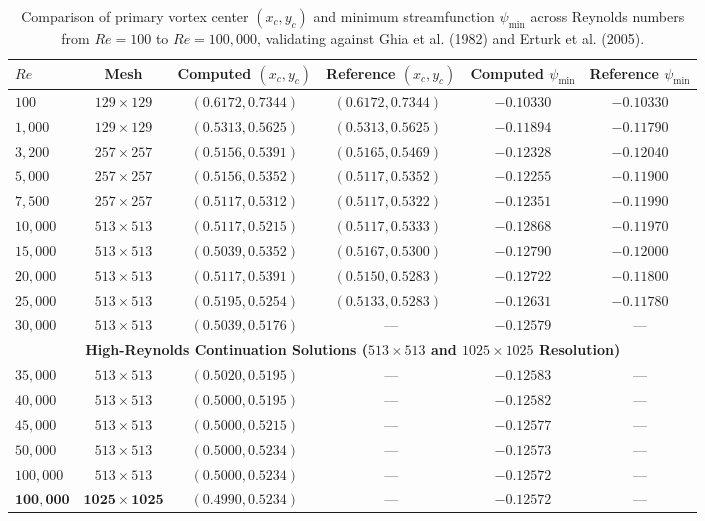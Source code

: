 \documentclass[11pt,a4paper]{article}
\begin{document}
\begin{table}[htbp]
\centering
\small
\caption{Comparison of primary vortex center $(x_c, y_c)$ and minimum streamfunction $\psi_{\min}$ across Reynolds numbers from $Re = 100$ to $Re = 100,000$, validating against Ghia et al. (1982) and Erturk et al. (2005).}
\label{tab:benchmarks}
\begin{tabular*}{\textwidth}{@{\extracolsep{\fill}}lccccc@{}}
\toprule
$Re$ & Mesh & Computed $(x_c, y_c)$ & Reference $(x_c, y_c)$ & Computed $\psi_{\min}$ & Reference $\psi_{\min}$ \\
\midrule
$100$   & $129 \times 129$ & $(0.6172, 0.7344)$ & $(0.6172, 0.7344)$~\cite{ghia1982high} & $-0.10330$ & $-0.10330$ \\
$1,000$ & $129 \times 129$ & $(0.5313, 0.5625)$ & $(0.5313, 0.5625)$~\cite{ghia1982high} & $-0.11894$ & $-0.11790$ \\
$3,200$ & $257 \times 257$ & $(0.5156, 0.5391)$ & $(0.5165, 0.5469)$~\cite{ghia1982high} & $-0.12328$ & $-0.12040$ \\
$5,000$ & $257 \times 257$ & $(0.5156, 0.5352)$ & $(0.5117, 0.5352)$~\cite{ghia1982high} & $-0.12255$ & $-0.11900$ \\
$7,500$ & $257 \times 257$ & $(0.5117, 0.5312)$ & $(0.5117, 0.5322)$~\cite{ghia1982high} & $-0.12351$ & $-0.11990$ \\
$10,000$& $513 \times 513$ & $\mathbf{(0.5117, 0.5215)}$ & $\mathbf{(0.5117, 0.5333)}$~\cite{ghia1982high} & $\mathbf{-0.12868}$ & $-0.11970$ \\
$15,000$& $513 \times 513$ & $(0.5039, 0.5352)$ & $(0.5167, 0.5300)$~\cite{erturk2005numerical} & $-0.12790$ & $-0.12000$ \\
$20,000$& $513 \times 513$ & $(0.5117, 0.5391)$ & $(0.5150, 0.5283)$~\cite{erturk2005numerical} & $-0.12722$ & $-0.11800$ \\
$25,000$& $513 \times 513$ & $\mathbf{(0.5195, 0.5254)}$ & $\mathbf{(0.5133, 0.5283)}$~\cite{erturk2009discussions} & $-0.12631$ & $-0.11780$ \\
$30,000$& $513 \times 513$ & $(0.5039, 0.5176)$ & --- & $-0.12579$ & --- \\
\midrule
\multicolumn{6}{c}{\textbf{High-Reynolds Continuation Solutions ($513 \times 513$ and $1025 \times 1025$ Resolution)}} \\
\midrule
$35,000$& $513 \times 513$ & $(0.5020, 0.5195)$ & --- & $-0.12583$ & --- \\
$40,000$& $513 \times 513$ & $(0.5000, 0.5195)$ & --- & $-0.12582$ & --- \\
$45,000$& $513 \times 513$ & $(0.5000, 0.5215)$ & --- & $-0.12577$ & --- \\
$50,000$& $513 \times 513$ & $\mathbf{(0.5000, 0.5234)}$ & --- & $\mathbf{-0.12573}$ & --- \\
$100,000$& $513 \times 513$ & $(0.5000, 0.5234)$ & --- & $-0.12572$ & --- \\
$\mathbf{100,000}$& $\mathbf{1025 \times 1025}$ & $\mathbf{(0.4990, 0.5234)}$ & --- & $\mathbf{-0.12572}$ & --- \\
\bottomrule
\end{tabular*}
\end{table}
\end{document}
